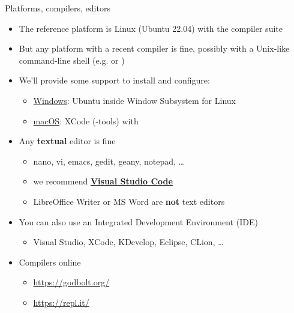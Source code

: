 \begin{frame}{Platforms, compilers, editors}
  \begin{itemize}[<+->]
  \item The reference platform is Linux (Ubuntu 22.04) with the 
    compiler suite
  \item But any platform with a recent compiler is fine, possibly with a
    Unix-like command-line shell (e.g.  or )
  \item We'll provide some support to install and configure:
    \begin{itemize}[<.->]
    \item
      \href{https://github.com/giacomini/pf2021/blob/main/doc/WSLGuide.md}{Windows}:
      Ubuntu inside Window Subsystem for Linux
    \item
      \href{https://github.com/giacomini/pf2021/blob/main/doc/macOSGuide.md}{macOS}:
      XCode (-tools) with 
    \end{itemize}
  \item Any \textbf{textual} editor is fine
    \begin{itemize}[<.->]
    \item nano, vi, emacs, gedit, geany, notepad, \ldots
    \item we recommend \href{https://code.visualstudio.com/}{\textbf{Visual
          Studio Code}}
    \item LibreOffice Writer or MS Word are \textbf{not} text editors
    \end{itemize}
  \item You can also use an Integrated Development Environment (IDE)
    \begin{itemize}[<.->]
    \item Visual Studio, XCode, KDevelop, Eclipse, CLion, \ldots
    \end{itemize}
  \item Compilers online
    \begin{itemize}[<.->]
    \item \url{https://godbolt.org/}
    \item \url{https://repl.it/}
    \end{itemize}
  \end{itemize}

\end{frame}

